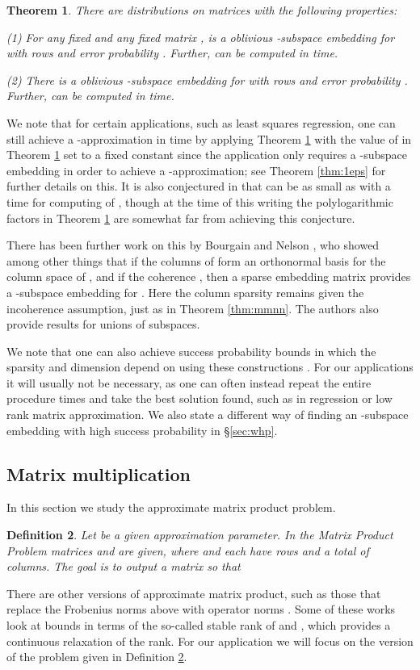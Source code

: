 \documentclass[11pt]{article}
\newtheorem{theorem}{Theorem}
\newtheorem{definition}[theorem]{Definition}
\begin{document}
\begin{theorem}\label{thm:nn}\cite{JH13}
There are distributions on matrices  with the following properties:

(1) For any fixed  and any fixed  matrix , 
 is a  oblivious -subspace embedding for 
with  rows and error probability . Further,  can be computed
in  time. 

(2) There is a  oblivious -subspace embedding for  
with  rows and error probability . 
Further,  can be computed
in  time. 
\end{theorem}
We note that for certain applications, such as least squares regression, one can
still achieve a -approximation in  time by applying Theorem \ref{thm:nn}
with the value of  in Theorem \ref{thm:nn} set to a fixed constant since the application only
requires a -subspace embedding in order to achieve a -approximation; see 
Theorem \ref{thm:1eps} for further details on this. It is also conjectured in \cite{JH13} that
 can be as small as  with a time for computing 
of , though at the time of this writing the polylogarithmic
factors in Theorem \ref{thm:nn} are somewhat far from achieving this conjecture. 

There has been further work on this by Bourgain and Nelson \cite{bn13}, 
who showed among other things that 
if the columns of  form an orthonormal basis for the column space of , and
if the coherence , then a sparse embedding
matrix provides a  -subspace embedding for . Here the column sparsity
remains  given the incoherence assumption, just as in Theorem \ref{thm:mmnn}. The authors also
provide results for unions of subspaces. 

We note that one can also achieve  success
probability 
bounds in which the sparsity and dimension depend on  using 
these constructions \cite{CW13,MM13,JH13}. For our
applications it will usually not be necessary, as one can often instead repeat the entire procedure 
times and take the best solution found, such as in regression or low rank matrix approximation. 
We also state a different
way of finding an -subspace embedding with high success probability in \S\ref{sec:whp}.

\subsection{Matrix multiplication}\label{sec:mm}
In this section we study the approximate matrix product problem. 

\begin{definition}\label{def:matrixProduct}
Let  be a given approximation parameter. 
In the {\em Matrix Product} Problem matrices  and  are given, 
where  and  each have  rows and a 
total of  columns.  
The goal is to output a 
matrix  so that 

\end{definition}
There are other versions of approximate matrix product, such as those that replace the Frobenius norms
above with operator norms \cite{Zou10,malik11,CEMMP14,CNW14}. 
Some of these works look at
bounds in terms of the so-called stable rank of  and , which
provides a continuous relaxation of the rank. 
For our application we will focus on the version of the
problem given in Definition \ref{def:matrixProduct}. 
\end{document}
